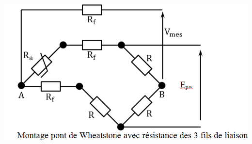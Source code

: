 \documentclass[10pt,fleqn]{article} %
\begin{document}
\begin{multicols}{2}
\begin{center}
\includegraphics[width=.95\linewidth]{images/montage_03}
\end{center}

\ifprof
\else
\end{multicols}
\fi
\end{document}
